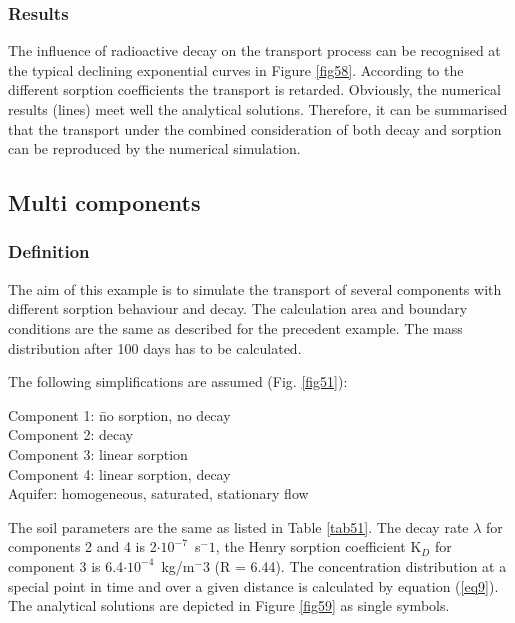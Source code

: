 \subsubsection{Results}

The influence of radioactive decay on the transport process can be recognised at the typical declining exponential curves in Figure \ref{fig58}. According to the different sorption coefficients the transport is retarded. Obviously, the numerical results (lines) meet well the analytical solutions. Therefore, it can be summarised that the transport under the combined consideration of both decay and sorption can be reproduced by the numerical simulation.

\subsection{Multi components}

\subsubsection{Definition}

The aim of this example is to simulate the transport of several components with different sorption behaviour and decay. The calculation area and boundary conditions are the same as described for the precedent example. The mass distribution after 100 days has to be calculated.

The following simplifications are assumed (Fig. \ref{fig51}):

\begin{tabbing}
Component 1: \= no sorption, no decay \\
Component 2: \> decay \\
Component 3: \> linear sorption \\
Component 4: \> linear sorption, decay \\
Aquifer: \> homogeneous, saturated, stationary flow \\
\end{tabbing}

The soil parameters are the same as listed in Table \ref{tab51}. The decay rate $\lambda$ for components 2 and 4 is 2$\cdot 10^{-7}$~s$^-1$, the Henry sorption coefficient K$_D$ for component 3 is 6.4$\cdot 10^{-4}$~kg/m$^-3$ (R = 6.44).
%
The concentration distribution at a special point in time and over a given distance is calculated by equation (\ref{eq9}). The analytical solutions are depicted in Figure \ref{fig59} as single symbols.

